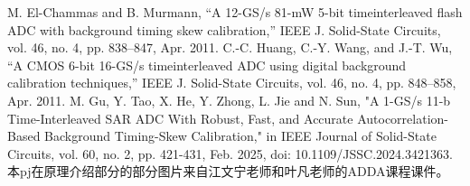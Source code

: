 \documentclass[cs4size,a4paper]{ctexart}
\numberwithin{equation}{section}
\numberwithin{table}{section}
\numberwithin{figure}{section}
\begin{document}
		
		
		
		
\clearpage

%
\begin{thebibliography}{100}
 M. El-Chammas and B. Murmann, “A 12-GS/s 81-mW 5-bit timeinterleaved flash ADC with background timing skew calibration,” IEEE J. Solid-State Circuits, vol. 46, no. 4, pp. 838–847, Apr. 2011.
 C.-C. Huang, C.-Y. Wang, and J.-T. Wu, “A CMOS 6-bit 16-GS/s timeinterleaved ADC using digital background calibration techniques,” IEEE J. Solid-State Circuits, vol. 46, no. 4, pp. 848–858, Apr. 2011.
 M. Gu, Y. Tao, X. He, Y. Zhong, L. Jie and N. Sun, "A 1-GS/s 11-b Time-Interleaved SAR ADC With Robust, Fast, and Accurate Autocorrelation-Based Background Timing-Skew Calibration," in IEEE Journal of Solid-State Circuits, vol. 60, no. 2, pp. 421-431, Feb. 2025, doi: 10.1109/JSSC.2024.3421363.
 本pj在原理介绍部分的部分图片来自江文宁老师和叶凡老师的ADDA课程课件。
\end{thebibliography}
\clearpage
% 
%
\end{document}
